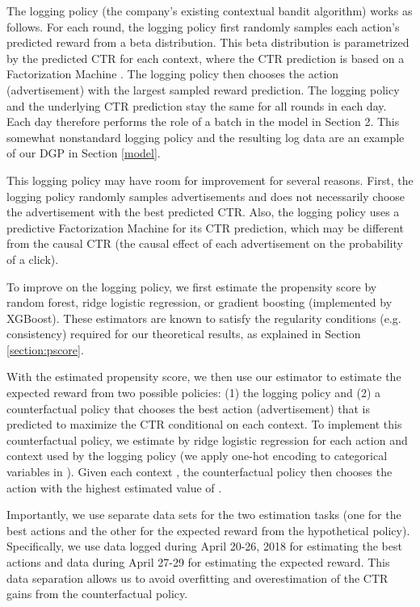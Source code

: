 \documentclass[letterpaper]{article} \usepackage{aaai19}  \usepackage{times}  \usepackage{helvet}  \usepackage{courier}  \usepackage{url}  \usepackage{graphicx}  \frenchspacing  \usepackage{comment}
\newcommand{\citep}{\cite}
\begin{document}
The logging policy (the company's existing contextual bandit algorithm) works as follows. 
For each round, the logging policy first randomly samples each action's predicted reward from a beta distribution. 
This beta distribution is parametrized by the predicted CTR for each context, where the CTR prediction is based on a Factorization Machine \citep{rendle2010factorization}. 
The logging policy then chooses the action (advertisement) with the largest sampled reward prediction. 
The logging policy and the underlying CTR prediction stay the same for all rounds in each day. 
Each day therefore performs the role of a batch in the model in Section 2. 
This somewhat nonstandard logging policy and the resulting log data are an example of our DGP in Section \ref{model}. 

This logging policy may have room for improvement for several reasons. 
First, the logging policy randomly samples advertisements and does not necessarily choose the advertisement with the best predicted CTR. 
Also, the logging policy uses a predictive Factorization Machine for its CTR prediction, which may be different from the causal CTR (the causal effect of each advertisement on the probability of a click). 

To improve on the logging policy, we first estimate the propensity score by random forest, ridge logistic regression, or gradient boosting (implemented by XGBoost). 
These estimators are known to satisfy the regularity conditions (e.g. consistency) required for our theoretical results, as explained in Section \ref{section:pscore}. 

With the estimated propensity score, we then use our estimator  to estimate the expected reward from two possible policies: 
(1) the logging policy and (2) a counterfactual policy that chooses the best action (advertisement) that is predicted to maximize the CTR conditional on each context. 
To implement this counterfactual policy, we estimate  by ridge logistic regression for each action  and context  used by the logging policy (we apply one-hot encoding to categorical variables in ). 
Given each context , the counterfactual policy then chooses the action with the highest estimated value of .

Importantly, we use separate data sets for the two estimation tasks (one for the best actions and the other for the expected reward from the hypothetical policy). 
Specifically, we use data logged during April 20-26, 2018 for estimating the best actions and data during April 27-29 for estimating the expected reward. 
This data separation allows us to avoid overfitting and overestimation of the CTR gains from the counterfactual policy. 
\end{document}
